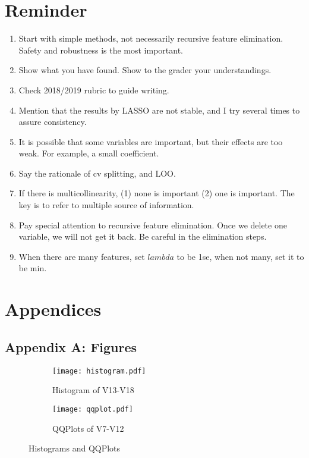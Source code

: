 \documentclass[11pt a4paper]{article}
\begin{document}
	\section{Reminder}
	\begin{enumerate}
		\item Start with simple methods, not necessarily recursive feature elimination. Safety and robustness is the most important.
		\item Show what you have found. Show to the grader your understandings.
		\item Check 2018/2019 rubric to guide writing.
		\item Mention that the results by LASSO are not stable, and I try several times to assure consistency.
		\item It is possible that some variables are important, but their effects are too weak. For example, a small coefficient.
		\item Say the rationale of cv splitting, and LOO. 
		\item If there is multicollinearity, (1) none is important (2) one is important. The key is to refer to multiple source of information.
		\item Pay special attention to recursive feature elimination. Once we delete one variable, we will not get it back. Be careful in the elimination steps.
		\item When there are many features, set $lambda$ to be 1se, when not many, set it to be min.
	\end{enumerate}
	
	
	\nocite*{}  
	
	
	
	\newpage
	\section*{Appendices}
	
	\subsection*{Appendix A: Figures}
	
	
	\begin{figure}[H]
		\centering
		\begin{subfigure}{.5\textwidth}
			\centering
			\texttt{[image: histogram.pdf]}
			\caption{Histogram of V13-V18}
			\label{fig:histogram}
		\end{subfigure}%
		\begin{subfigure}{.5\textwidth}
			\centering
			\texttt{[image: qqplot.pdf]}
			\caption{QQPlots of V7-V12}
			\label{fig:qqplot}
		\end{subfigure}
		\caption{Histograms and QQPlots}
		\label{fig: eda-1}
	\end{figure}
	
\end{document}
